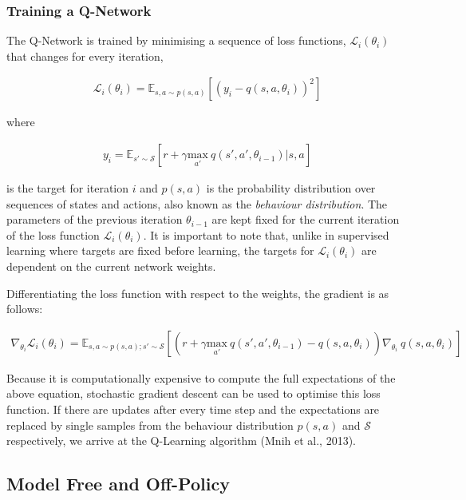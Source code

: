 \documentclass{article}
\begin{document}
\subsubsection{Training a Q-Network}

The Q-Network is trained by minimising a sequence of loss functions, $\mathcal{L}_i(\theta_i)$ that changes for every iteration,

\begin{align}
    \mathcal{L}_i(\theta_i) = \mathbb{E}_{s,a \sim p(s,a)} \left[ (y_i - q(s,a, \theta_i))^2 \right]
\end{align}

where 

\begin{align}
    y_i = \mathbb{E}_{s' \sim \mathcal{S}} \left[r + \gamma \underset{a'}{\text{max}}\ q(s', a', \theta_{i-1})|s,a \right]    
\end{align}

is the target for iteration $i$ and $p(s,a)$ is the probability distribution over sequences of states and actions, also known as the \textit{behaviour distribution}. The parameters of the previous iteration $\theta_{i-1}$ are kept fixed for the current iteration of the loss function $\mathcal{L}_i(\theta_i)$. It is important to note that, unlike in supervised learning where targets are fixed before learning, the targets for $\mathcal{L}_i(\theta_i)$ are dependent on the current network weights. 

Differentiating the loss function with respect to the weights, the gradient is as follows: 

\begin{align}
    \nabla_{\theta_i} \mathcal{L}_i (\theta_i) = \mathbb{E}_{s,a \sim p(s,a);s' \sim \mathcal{S}} \left[ (r + \gamma \underset{a'}{\text{max}}\ q(s', a', \theta_{i-1}) - q(s,a,\theta_i)) \nabla_{\theta_i}\ q(s,a,\theta_i) \right]
\end{align}

Because it is computationally expensive to compute the full expectations of the above equation, stochastic gradient descent can be used to optimise this loss function. If there are updates after every time step and the expectations are replaced by single samples from the behaviour distribution $p(s,a)$ and $\mathcal{S}$ respectively, we arrive at the Q-Learning algorithm (Mnih et al., 2013). 

\subsection{Model Free and Off-Policy}
\end{document}
